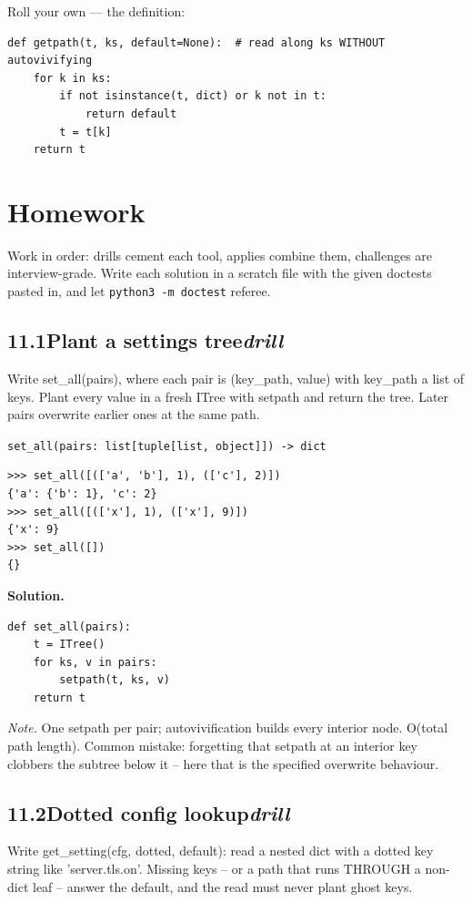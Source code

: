 \documentclass[10pt,letterpaper]{book}
\begin{document}
Roll your own --- the definition:

\begin{lstlisting}[style=ex]
def getpath(t, ks, default=None):  # read along ks WITHOUT autovivifying
    for k in ks:
        if not isinstance(t, dict) or k not in t:
            return default
        t = t[k]
    return t
\end{lstlisting}
\section{Homework}
Work in order: drills cement each tool, applies combine them,
challenges are interview-grade. Write each solution in a scratch file with
the given doctests pasted in, and let \texttt{python3 -m doctest} referee.
\subsection*{11.1\quad Plant a settings tree\hfill\textnormal{\textit{drill}}}
Write set\_all(pairs), where each pair is (key\_path, value) with key\_path a list of keys. Plant every value in a fresh ITree with setpath and return the tree. Later pairs overwrite earlier ones at the same path.

\noindent\texttt{set\_all(pairs: list[tuple[list, object]]) -> dict}
\begin{lstlisting}[style=ex]
>>> set_all([(['a', 'b'], 1), (['c'], 2)])
{'a': {'b': 1}, 'c': 2}
>>> set_all([(['x'], 1), (['x'], 9)])
{'x': 9}
>>> set_all([])
{}
\end{lstlisting}
\noindent\textbf{Solution.}
\begin{lstlisting}[style=code]
def set_all(pairs):
    t = ITree()
    for ks, v in pairs:
        setpath(t, ks, v)
    return t
\end{lstlisting}
\noindent\textit{Note.} One setpath per pair; autovivification builds every interior node. O(total path length). Common mistake: forgetting that setpath at an interior key clobbers the subtree below it -- here that is the specified overwrite behaviour.

\subsection*{11.2\quad Dotted config lookup\hfill\textnormal{\textit{drill}}}
Write get\_setting(cfg, dotted, default): read a nested dict with a dotted key string like 'server.tls.on'. Missing keys -- or a path that runs THROUGH a non-dict leaf -- answer the default, and the read must never plant ghost keys.
\end{document}
